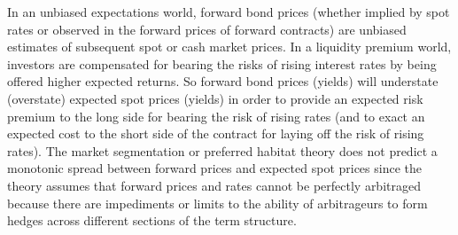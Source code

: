 \documentclass[11pt]{article}
\begin{document}
In an unbiased expectations world, forward bond prices (whether implied by spot rates or observed in the forward prices of forward contracts) are unbiased estimates of subsequent spot or cash market prices. In a liquidity premium world, investors are compensated for bearing the risks of rising interest rates by being offered higher expected returns. So forward bond prices (yields) will understate (overstate) expected spot prices (yields) in order to provide an expected risk premium to the long side for bearing the risk of rising rates (and to exact an expected cost to the short side of the contract for laying off the risk of rising rates). The market segmentation or preferred habitat theory does not predict a monotonic spread between forward prices and expected spot prices since the theory assumes that forward prices and rates cannot be perfectly arbitraged because there are impediments or limits to the ability of arbitrageurs to form hedges across different sections of the term structure.
\end{document}
